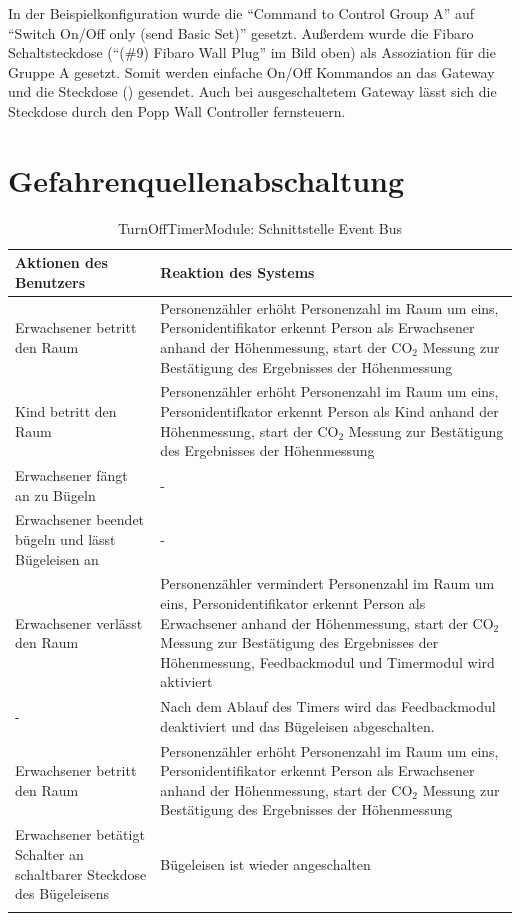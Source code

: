 In der Beispielkonfiguration wurde die "`Command to Control Group A"' auf "`Switch On/Off only (send Basic Set)"' gesetzt. Außerdem wurde die Fibaro Schaltsteckdose ("`(\#9) Fibaro Wall Plug"' im Bild oben) als Assoziation für die Gruppe A gesetzt. Somit werden einfache On/Off Kommandos an das Gateway und die Steckdose () gesendet. Auch bei ausgeschaltetem Gateway lässt sich die Steckdose durch den Popp Wall Controller fernsteuern.


\section{Gefahrenquellenabschaltung}

\begin{longtabu} to 
	\hline
	\textbf{Aktionen des Benutzers}									& \textbf{Reaktion des Systems} \\
	\hline
	\endhead
	Erwachsener betritt den Raum	& Personenzähler erhöht Personenzahl im Raum um eins, Personidentifikator erkennt Person als Erwachsener anhand der Höhenmessung, start der CO$_2$ Messung zur Bestätigung des Ergebnisses der Höhenmessung \\
	\hline
	Kind betritt den Raum	& Personenzähler erhöht Personenzahl im Raum um eins, Personidentifkator erkennt Person als Kind anhand der Höhenmessung, start der CO$_2$ Messung zur Bestätigung des Ergebnisses der Höhenmessung \\
	\hline
	Erwachsener fängt an zu Bügeln	& - \\
	\hline
	Erwachsener beendet bügeln und lässt Bügeleisen an	& - \\
	\hline
	Erwachsener verlässt den Raum	& Personenzähler vermindert Personenzahl im Raum um eins, Personidentifikator erkennt Person als Erwachsener anhand der Höhenmessung, start der CO$_2$ Messung zur Bestätigung des Ergebnisses der Höhenmessung, Feedbackmodul und Timermodul wird aktiviert \\
	\hline
	-	& Nach dem Ablauf des Timers wird das Feedbackmodul deaktiviert und das Bügeleisen abgeschalten. \\
	\hline
	Erwachsener betritt den Raum	& Personenzähler erhöht Personenzahl im Raum um eins, Personidentifikator erkennt Person als Erwachsener anhand der Höhenmessung, start der CO$_2$ Messung zur Bestätigung des Ergebnisses der Höhenmessung \\
	\hline
	Erwachsener betätigt Schalter an schaltbarer Steckdose des Bügeleisens 	& Bügeleisen ist wieder angeschalten \\
	\hline
	\caption{TurnOffTimerModule: Schnittstelle Event Bus}
\end{longtabu}


